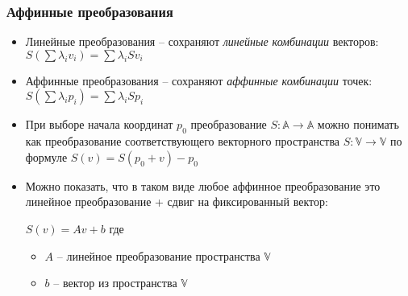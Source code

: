\documentclass[10pt]{beamer}
\begin{document}
\begin{frame}[fragile]
\frametitle{Аффинные преобразования}
\begin{itemize}
\item Линейные преобразования -- сохраняют \textit{линейные комбинации} векторов: \begin{math}S \left(\sum \lambda_i v_i\right) = \sum \lambda_i S v_i\end{math}
\pause
\item Аффинные преобразования -- сохраняют \textit{аффинные комбинации} точек: \begin{math}S \left(\sum \lambda_i p_i\right) = \sum \lambda_i S p_i\end{math}
\pause
\item При выборе начала координат \begin{math}p_0\end{math} преобразование \begin{math}S: \mathbb A \rightarrow \mathbb A\end{math} можно понимать как преобразование соответствующего векторного пространства
\begin{math}S: \mathbb V \rightarrow \mathbb V\end{math} по формуле \begin{math}S(v) = S(p_0 + v) - p_0\end{math}
\pause
\item Можно показать, что в таком виде любое аффинное преобразование это линейное преобразование + сдвиг на фиксированный вектор:

\begin{math}S(v) = Av + b\end{math}
где
\begin{itemize}
\item \begin{math}A\end{math} -- линейное преобразование пространства \begin{math}\mathbb V\end{math}
\item \begin{math}b\end{math} -- вектор из пространства \begin{math}\mathbb V\end{math}
\end{itemize}
\end{itemize}
\end{frame}
\end{document}
